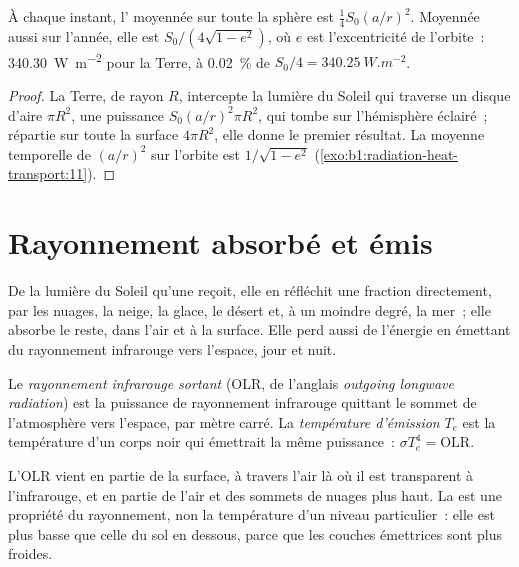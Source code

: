 \begin{proposition}\label{prop:b1:radiation-heat-transport:global}
À chaque instant, l' moyennée sur toute la sphère est $\tfrac14
S_0(a/r)^2$. Moyennée aussi sur l'année, elle est $S_0/(4\sqrt{1 - e^2})$, où
$e$ est l'excentricité de l'orbite~: \qty{340.30}{W.m^{-2}} pour la Terre, à
\qty{0.02}{\percent} de $S_0/4 = \qty{340.25}{W.m^{-2}}$.
\end{proposition}

\begin{proof}
La Terre, de rayon $R$, intercepte la lumière du Soleil qui traverse un disque d'aire $\pi
R^2$, une puissance $S_0(a/r)^2\pi R^2$, qui tombe sur l'hémisphère éclairé~; répartie sur
toute la surface $4\pi R^2$, elle donne le premier résultat. La moyenne temporelle de
$(a/r)^2$ sur l'orbite est $1/\sqrt{1-e^2}$
(\cref{exo:b1:radiation-heat-transport:11}).
\end{proof}

\section{Rayonnement absorbé et émis}\label{sec:b1:radiation-heat-transport:toa}

De la lumière du Soleil qu'une  reçoit, elle en réfléchit une fraction directement, par les
nuages, la neige, la glace, le désert et, à un moindre degré, la mer~; elle absorbe le reste, dans
l'air et à la surface. Elle perd aussi de l'énergie en émettant du rayonnement infrarouge
vers l'espace, jour et nuit.

\begin{definition}\label{def:b1:radiation-heat-transport:olr}
Le \emph{rayonnement infrarouge sortant} (OLR, de l'anglais \textit{outgoing longwave radiation})
est la puissance de rayonnement infrarouge quittant le sommet de l'atmosphère vers l'espace,
par mètre carré. La \emph{température d'émission}
$T_e$ est la température d'un corps noir qui émettrait la même puissance~:
$\sigma T_e^4 = \text{OLR}$.
\end{definition}

L'OLR vient en partie de la surface, à travers l'air là où il est transparent
à l'infrarouge, et en partie de l'air et des sommets de nuages plus haut. La 
est une propriété du
rayonnement, non la température d'un niveau particulier~: elle est plus basse que celle
du sol en dessous, parce que les couches émettrices sont plus froides.

